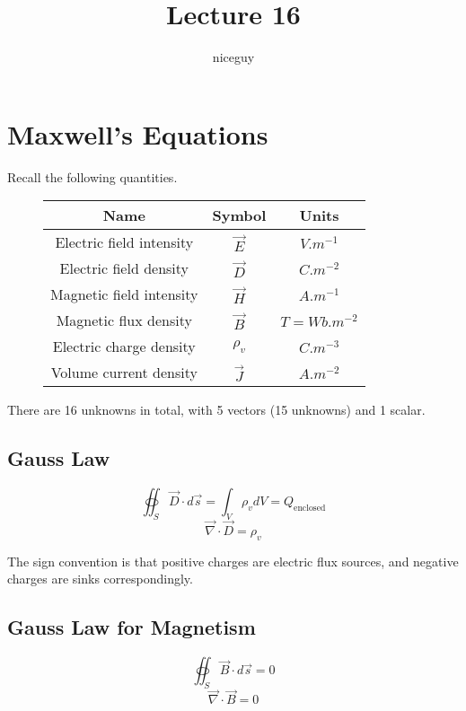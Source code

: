 \documentclass[12pt]{article}
\title{Lecture 16}
\author{niceguy}
\begin{document}
\maketitle

\section{Maxwell's Equations}

Recall the following quantities.

\begin{figure}[h!]
\begin{center}
\begin{tabular}{|c|c|c|}
    \hline
    Name & Symbol & Units \\
    \hline\hline
    Electric field intensity & $\vec E$ & $\unit{V.m^{-1}}$ \\
    \hline
    Electric field density & $\vec D$ & $\unit{C.m^{-2}}$ \\
    \hline
    Magnetic field intensity & $\vec H$ & $\unit{A.m^{-1}}$ \\
    \hline
    Magnetic flux density & $\vec B$ & $\unit{T} = \unit{Wb.m^{-2}}$ \\
    \hline
    Electric charge density & $\rho_v$ & $\unit{C.m^{-3}}$ \\
    \hline
    Volume current density & $\vec J$ & $\unit{A.m^{-2}}$ \\
    \hline
\end{tabular}
\end{center}
\end{figure}

There are 16 unknowns in total, with 5 vectors (15 unknowns) and 1 scalar.

\subsection{Gauss Law}

$$\oiint_S \vec D \cdot d\vec s = \int_V \rho_v dV = Q_{\text{enclosed}}$$
$$\vec\nabla\cdot\vec D = \rho_v$$

The sign convention is that positive charges are electric flux sources, and negative charges are sinks correspondingly.

\subsection{Gauss Law for Magnetism}

$$\oiint_S \vec B\cdot d\vec s = 0$$
$$\vec\nabla \cdot \vec B = 0$$
\end{document}
